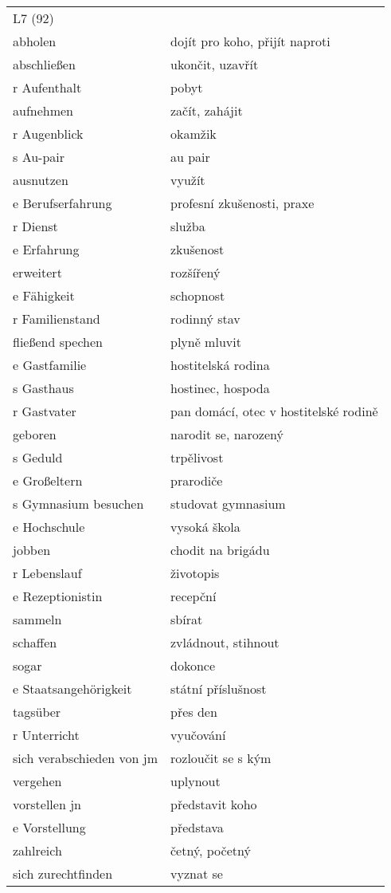 \documentclass{article}
\begin{document}
\newpage

\begin{tabular}{ p{5cm}|p{5cm}  }
    \\
    L7 (92) \\
    abholen & dojít pro koho, přijít naproti\\
    abschlie{\ss}en & ukončit, uzavřít\\
    r Aufenthalt & pobyt\\
    aufnehmen & začít, zahájit\\
    r Augenblick & okamžik\\
    s Au-pair & au pair\\
    ausnutzen & využít\\
    e Berufserfahrung & profesní zkušenosti, praxe \\
    r Dienst & služba\\
    e Erfahrung & zkušenost\\
    erweitert & rozšířený\\
    e Fähigkeit & schopnost\\
    r Familienstand & rodinný stav\\
    flie{\ss}end spechen & plyně mluvit\\
    e Gastfamilie & hostitelská rodina\\
    s Gasthaus & hostinec, hospoda\\
    r Gastvater & pan domácí, otec v hostitelské rodině\\
    geboren & narodit se, narozený\\
    s Geduld & trpělivost\\
    e Gro{\ss}eltern & prarodiče\\
    s Gymnasium besuchen & studovat gymnasium\\
    e Hochschule & vysoká škola\\
    jobben & chodit na brigádu\\
    r Lebenslauf & životopis\\
    e Rezeptionistin & recepční\\
    sammeln & sbírat\\
    schaffen & zvládnout, stihnout\\
    sogar & dokonce\\
    e Staatsangehörigkeit & státní příslušnost\\
    tagsüber & přes den\\
    r Unterricht & vyučování\\
    sich verabschieden von jm & rozloučit se s kým\\
    vergehen & uplynout\\
    vorstellen jn& představit koho\\
    e Vorstellung & představa\\
    zahlreich & četný, početný\\
    sich zurechtfinden & vyznat se\\

\end{tabular}
    
\end{document}
